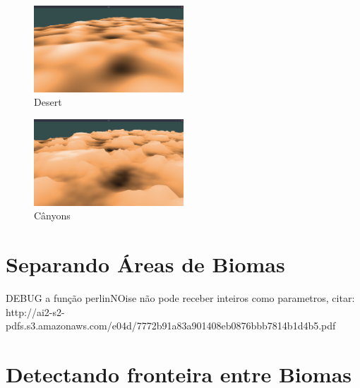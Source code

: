\begin{figure}[H]
    \centering
    \includegraphics[width=0.5\textwidth]{figuras/bssDesert.png}
    \caption{Desert}
    \label{fig:bssDesert}
\end{figure}



\begin{figure}[H]
    \centering
    \includegraphics[width=0.5\textwidth]{figuras/bssCanyons.png}
    \caption{Cânyons}
    \label{fig:bssCanyons}
\end{figure}

\section{Separando Áreas de Biomas}

DEBUG a função perlinNOise não pode receber inteiros como parametros, citar:
http://ai2-s2-pdfs.s3.amazonaws.com/e04d/7772b91a83a901408eb0876bbb7814b1d4b5.pdf


\section{Detectando fronteira entre Biomas}